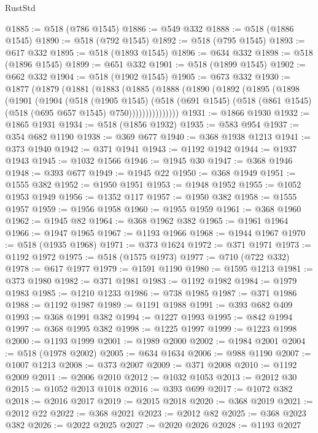 \begin{lexlean}{RustStd}
\begin{coremodule}
@1885 := @518 (@786 @1545)
@1886 := @549 @332
@1888 := @518 (@1886 @1545)
@1890 := @518 (@792 @1545)
@1892 := @518 (@795 @1545)
@1893 := @617 @332
@1895 := @518 (@1893 @1545)
@1896 := @634 @332
@1898 := @518 (@1896 @1545)
@1899 := @651 @332
@1901 := @518 (@1899 @1545)
@1902 := @662 @332
@1904 := @518 (@1902 @1545)
@1905 := @673 @332
@1930 := @1877
    (@1879
      (@1881
        (@1883
          (@1885
            (@1888
              (@1890
                (@1892
                  (@1895
                    (@1898
                      (@1901
                        (@1904
                          (@518
                            (@1905 @1545)
                            (@518
                              (@691 @1545)
                              (@518 (@861 @1545) (@518 (@695 @657 @1545) @750)))))))))))))))
@1931 := @1866 @1930
@1932 := @1865 @1931
@1934 := @518 (@1856 @1932)
@1935 := @583 @954
@1937 := @354 @682 @1190
@1938 := @369 @677
@1940 := @368 @1938 @1213
@1941 := @373 @1940
@1942 := @371 @1941
@1943 := @1192 @1942
@1944 := @1937 @1943
@1945 := @1032 @1566
@1946 := @1945 @30
@1947 := @368 @1946
@1948 := @393 @677
@1949 := @1945 @22
@1950 := @368 @1949
@1951 := @1555 @382
@1952 := @1950 @1951
@1953 := @1948 @1952
@1955 := @1052 @1953 @1949
@1956 := @1352 @117
@1957 := @1950 @382
@1958 := @1555 @1957
@1959 := @1956 @1958
@1960 := @1955 @1959
@1961 := @368 @1960
@1962 := @1945 @82
@1964 := @368 @1962 @382
@1965 := @1961 @1964
@1966 := @1947 @1965
@1967 := @1193 @1966
@1968 := @1944 @1967
@1970 := @518 (@1935 @1968)
@1971 := @373 @1624
@1972 := @371 @1971
@1973 := @1192 @1972
@1975 := @518 (@1575 @1973)
@1977 := @710 (@722 @332)
@1978 := @617 @1977
@1979 := @1591 @1190
@1980 := @1595 @1213
@1981 := @373 @1980
@1982 := @371 @1981
@1983 := @1192 @1982
@1984 := @1979 @1983
@1985 := @1210 @1233
@1986 := @738 @1985
@1987 := @371 @1986
@1988 := @1192 @1987
@1989 := @1191 @1988
@1991 := @393 @682 @409
@1993 := @368 @1991 @382
@1994 := @1227 @1993
@1995 := @842 @1994
@1997 := @368 @1995 @382
@1998 := @1225 @1997
@1999 := @1223 @1998
@2000 := @1193 @1999
@2001 := @1989 @2000
@2002 := @1984 @2001
@2004 := @518 (@1978 @2002)
@2005 := @634 @1634
@2006 := @988 @1190
@2007 := @1007 @1213
@2008 := @373 @2007
@2009 := @371 @2008
@2010 := @1192 @2009
@2011 := @2006 @2010
@2012 := @1032 @1053
@2013 := @2012 @30
@2015 := @1052 @2013 @1018
@2016 := @393 @699
@2017 := @1072 @382
@2018 := @2016 @2017
@2019 := @2015 @2018
@2020 := @368 @2019
@2021 := @2012 @22
@2022 := @368 @2021
@2023 := @2012 @82
@2025 := @368 @2023 @382
@2026 := @2022 @2025
@2027 := @2020 @2026
@2028 := @1193 @2027

\end{coremodule}
\end{lexlean}
